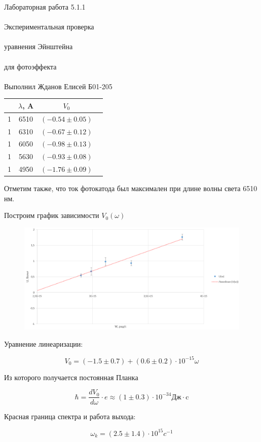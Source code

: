 \documentclass{astroedu-lab}
\begin{document}
\begin{problem}{\huge Лабораторная работа 5.1.1\\\\Экспериментальная проверка\\\\ уравнения Эйнштейна\\\\
для фотоэффекта\\\\Выполнил Жданов Елисей Б01-205}
\begin{center}
\begin{tabular}{|c|c|c|c|}
\hline 
& $\lambda$, A & $V_0$ \\
\hline
1 & 6510 & $(-0.54 \pm 0.05)$ \\
1 & 6310 & $(-0.67 \pm 0.12)$ \\
1 & 6050 & $(-0.98 \pm 0.13)$ \\
1 & 5630 & $(-0.93 \pm 0.08)$ \\
1 & 4950 & $(-1.76 \pm 0.09)$ \\
\hline
\end{tabular}
\end{center}

Отметим также, что ток фотокатода был максимален при длине волны света 6510 нм. 

Построим график зависимости $V_0(\omega)$
	


\begin{figure}[!h]
	\centering
	\includegraphics[width=1\textwidth]{2024-09-29_02-12-13.png}
	\label{fig:boiler}
\end{figure}

Уравнение линеаризации:

\begin{equation}
	V_0 = (-1.5 \pm 0.7) + (0.6 \pm 0.2)\cdot 10^{-15} \omega
\end{equation}

Из которого получается постоянная Планка

\begin{equation}
	\hbar = \frac{d V_0}{d \omega} \cdot e \approx (1 \pm 0.3) \cdot 10^{-34} \text{Дж} \cdot \text{c}
\end{equation}

Красная граница спектра и работа выхода:

\begin{equation}
	\omega_k = (2.5 \pm 1.4) \cdot 10^{15} c^{-1}
\end{equation}


\end{problem}
\end{document}
